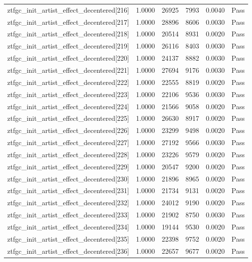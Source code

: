 \begin{table}[htbp]
\begin{tabular}{llrrll}
ztfgc\_init\_artist\_effect\_decentered[216] & 1.0000 & 26925 & 7993 & 0.0040 & Pass \\
ztfgc\_init\_artist\_effect\_decentered[217] & 1.0000 & 28896 & 8606 & 0.0030 & Pass \\
ztfgc\_init\_artist\_effect\_decentered[218] & 1.0000 & 20514 & 8931 & 0.0020 & Pass \\
ztfgc\_init\_artist\_effect\_decentered[219] & 1.0000 & 26116 & 8403 & 0.0030 & Pass \\
ztfgc\_init\_artist\_effect\_decentered[220] & 1.0000 & 24137 & 8882 & 0.0030 & Pass \\
ztfgc\_init\_artist\_effect\_decentered[221] & 1.0000 & 27694 & 9176 & 0.0030 & Pass \\
ztfgc\_init\_artist\_effect\_decentered[222] & 1.0000 & 22555 & 8819 & 0.0020 & Pass \\
ztfgc\_init\_artist\_effect\_decentered[223] & 1.0000 & 22106 & 9536 & 0.0030 & Pass \\
ztfgc\_init\_artist\_effect\_decentered[224] & 1.0000 & 21566 & 9058 & 0.0020 & Pass \\
ztfgc\_init\_artist\_effect\_decentered[225] & 1.0000 & 26630 & 8917 & 0.0020 & Pass \\
ztfgc\_init\_artist\_effect\_decentered[226] & 1.0000 & 23299 & 9498 & 0.0020 & Pass \\
ztfgc\_init\_artist\_effect\_decentered[227] & 1.0000 & 27192 & 9566 & 0.0030 & Pass \\
ztfgc\_init\_artist\_effect\_decentered[228] & 1.0000 & 23226 & 9579 & 0.0020 & Pass \\
ztfgc\_init\_artist\_effect\_decentered[229] & 1.0000 & 20547 & 9200 & 0.0020 & Pass \\
ztfgc\_init\_artist\_effect\_decentered[230] & 1.0000 & 21896 & 8965 & 0.0020 & Pass \\
ztfgc\_init\_artist\_effect\_decentered[231] & 1.0000 & 21734 & 9131 & 0.0020 & Pass \\
ztfgc\_init\_artist\_effect\_decentered[232] & 1.0000 & 24012 & 9190 & 0.0020 & Pass \\
ztfgc\_init\_artist\_effect\_decentered[233] & 1.0000 & 21902 & 8750 & 0.0030 & Pass \\
ztfgc\_init\_artist\_effect\_decentered[234] & 1.0000 & 19144 & 9530 & 0.0020 & Pass \\
ztfgc\_init\_artist\_effect\_decentered[235] & 1.0000 & 22398 & 9752 & 0.0020 & Pass \\
ztfgc\_init\_artist\_effect\_decentered[236] & 1.0000 & 22657 & 9677 & 0.0020 & Pass \\

\end{tabular}
\end{table}
